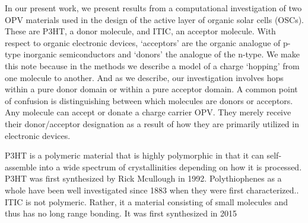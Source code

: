 In our present work, we present results from a computational investigation of two OPV materials
used in the design of the active layer of organic solar cells (OSCs). These are P3HT, a
donor molecule, and ITIC, an acceptor molecule. With respect to organic electronic devices, `acceptors' are the
organic analogue of p-type inorganic semiconductors and `donors' the analogue
of the n-type. We make this note because in the methods we describe a model of
a charge `hopping' from one molecule to another. And as we describe, our
investigation involves hops within a pure donor domain or within a pure
acceptor domain. A common point of confusion is distinguishing between which
molecules are donors or acceptors.
Any molecule can accept or donate a charge carrier OPV.
They merely receive their donor/acceptor designation as a result of how they
are primarily utilized in electronic devices. 

P3HT is a polymeric material that is highly polymorphic in that it can self-assemble into a wide spectrum of
crystallinities depending on how it is processed. 
P3HT was first synthesized by Rick Mcullough in 1992. Polythiophenes as a whole have been well investigated 
since 1883 when they were first characterized.\cite{Poelking2014}.
ITIC is not polymeric. Rather, it a material consisting of small molecules and thus has no long range bonding.
It was first synthesized in 2015 \cite{Bai201U}

